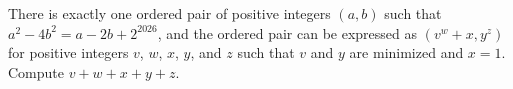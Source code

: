 There is exactly one ordered pair of positive integers $(a,b)$ such that $a^2-4b^2=a-2b+2^{2026}$, and the ordered pair can be expressed as $\left(v^w+x,y^z\right)$ for positive integers $v$, $w$, $x$, $y$, and $z$ such that $v$ and $y$ are minimized and $x=1$. Compute $v+w+x+y+z$.

